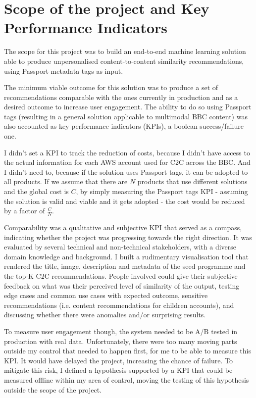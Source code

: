 
\section{Scope of the project and Key Performance Indicators}

The scope for this project was to build an end-to-end machine learning solution able to produce unpersonalised content-to-content
similarity recommendations, using Passport metadata tags as input.

The minimum viable outcome for this solution was to produce a set of recommendations comparable with the ones currently in production and
as a desired outcome to increase user engagement. The ability to do so using Passport tags (resulting in a general solution applicable to multimodal
BBC content) was also accounted as key performance indicators (KPIs), a boolean success/failure one.

I didn't set a KPI to track the reduction of costs, because I didn't have access to the actual information for each AWS account used for C2C across
the BBC. And I didn't need to, because if the solution uses Passport tags, it can be adopted to all products.
If we assume that there are $N$ products that use different solutions and the global cost is $C$, by simply measuring the Passport tags KPI -
assuming the solution is valid and viable and it gets adopted - the cost would be reduced by a factor of $\frac{C}{N}$.

Comparability was a qualitative and subjective KPI that served as a compass, indicating whether the project was progressing towards the right direction.
It was evaluated by several technical and non-technical stakeholders, with a diverse domain knowledge and background. I built a rudimentary visualisation
tool that rendered the title, image, description and metadata of the seed programme and the top-K C2C recommendations.
People involved could give their subjective feedback on what was their perceived level of similarity of the output,
testing edge cases and common use cases with expected outcome, sensitive recommendations (i.e. content recommendations for children accounts),
and discussing whether there were anomalies and/or surprising results.

To measure user engagement though, the system needed to be A/B tested in production with real data.
Unfortunately, there were too many moving parts outside my control that needed to happen first, for me to be able to measure this KPI.
It would have delayed the project, increasing the chance of failure.
To mitigate this risk, I defined a hypothesis supported by a KPI that could be measured offline within my area of control, moving the
testing of this hypothesis outside the scope of the project.

